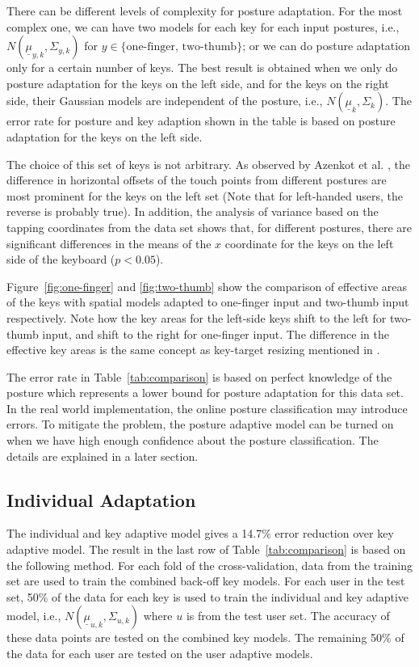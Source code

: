 \documentclass{sigchi}
\begin{document}
There can be different levels of complexity for posture adaptation. For the most complex one, we can have
two models for each key for each input postures, i.e., $N(\underline \mu_{y,k}, \Sigma_{y,k})$ for $y \in
\{\text{one-finger, two-thumb}\}$; or we can do posture adaptation only for a certain
number of keys. The best result is obtained when we only do posture adaptation for the keys on 
the left side, and for the keys on the right side, their Gaussian models are
independent of the posture, i.e., $N(\underline\mu_k, \Sigma_k)$.
The error rate for posture and key adaption shown in the table is based on 
posture adaptation for the keys on the left side. 

The choice of this set of keys is not arbitrary. As observed by Azenkot et al. \cite{Azenkot:2012}, the difference in horizontal
offsets of the touch points from different postures are most prominent for the keys on the
left set (Note that for left-handed users, the reverse is probably true). 
In addition, the analysis of variance based on the tapping coordinates from the
data set shows that, for different postures, there are significant differences in the means of
the $x$ coordinate for the keys on the left side of the keyboard ($p < 0.05$). 

Figure~\ref{fig:one-finger} and \ref{fig:two-thumb} show the comparison of effective areas of the keys
with spatial models adapted to one-finger input and two-thumb input respectively. Note how the key areas for the left-side keys shift to the left
for two-thumb input, and shift to the right for one-finger input. The difference in 
the effective key areas is the same concept as key-target resizing mentioned in \cite{Gunawardana:2010, Rudchenko:2011}.

The error rate in Table~\ref{tab:comparison} is based on perfect knowledge of
the posture which represents a lower bound for posture adaptation for this data
set. In the real world implementation, the online posture classification may
introduce errors. To mitigate the problem, the posture adaptive model can be turned on
when we have high enough confidence about the posture classification. The details are explained in a later section.

\subsection{Individual Adaptation}
The individual and key adaptive model gives a 14.7\% error reduction over key adaptive model. The result in the last row of Table~\ref{tab:comparison} is based on the 
following method. For each fold of the cross-validation, data from the training set are used to 
train the combined back-off key models. For each user in the test set,
50\% of the data for each key is used to train the individual and key adaptive
model, i.e., $N(\underline \mu_{u, k}, \Sigma_{u, k})$ where $u$ is from the test user set.
The accuracy of these data points are tested on the combined key models.
The remaining 50\% of the data for each user are tested on the user adaptive 
models. 
\end{document}

